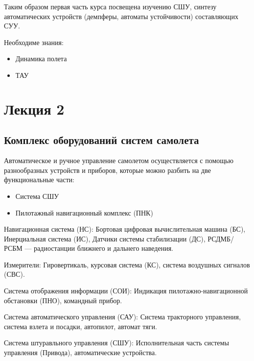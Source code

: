 \documentclass{article}
\begin{document}
Таким образом первая часть курса посвещена изучению СШУ, синтезу автоматических устройств (демпферы, автоматы устойчивости) составляющих СУУ.

Необходиме знания:
\begin{itemize}
	\item Динамика полета
	\item ТАУ
\end{itemize}
\newpage

\section{Лекция 2}
\subsection{Комплекс оборудований систем самолета}

Автоматическое и ручное управление самолетом осуществляется с помощью разнообразных устройств и приборов, которые можно разбить на две функциональные части:
\begin{itemize}
	\item{Система СШУ}
	\item{Пилотажный навигационный комплекс (ПНК)}
\end{itemize}

Навигационная система (НС): Бортовая цифровая вычислительная машина (БС), Инерциальная система (ИС), Датчики системы стабилизации (ДС), РСДМБ/РСБМ --- радиостанции ближнего и дальнего наведения. 

Измерители: Гировертикаль, курсовая система (КС), система воздушных сигналов (СВС).

Система отображения информации (СОИ): Индикация пилотажно-навигационной обстановки (ПНО), командный прибор.

Система автоматического управления (САУ): Система тракторного управления, система взлета и посадки, автопилот, автомат тяги.

Система штуравльного управления (СШУ): Исполнительная часть системы управления (Привода), автоматические устройства.
\end{document}
